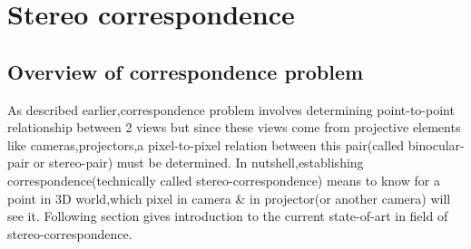 \chapter{Stereo correspondence}
\section{Overview of correspondence problem}
As described earlier,correspondence problem involves determining point-to-point relationship between 2 views but since these views come from projective elements like cameras,projectors,a pixel-to-pixel relation between this pair(called binocular-pair or stereo-pair) must be determined. In nutshell,establishing correspondence(technically called stereo-correspondence) means to know for a point in 3D world,which pixel in camera \& in projector(or another camera) will see it. Following section gives introduction to the current state-of-art in field of stereo-correspondence.

